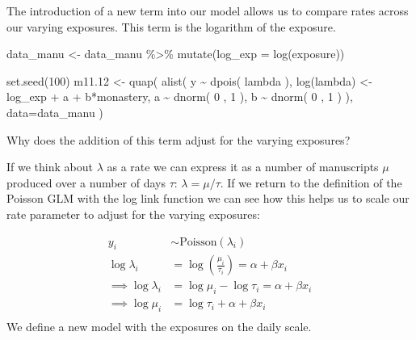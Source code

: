 \documentclass[
]{book}
\newenvironment{Shaded}{\begin{snugshade}}{\end{snugshade}}
\newcommand{\AttributeTok}[1]{\textcolor[rgb]{0.77,0.63,0.00}{#1}}
\newcommand{\DecValTok}[1]{\textcolor[rgb]{0.00,0.00,0.81}{#1}}
\newcommand{\FloatTok}[1]{\textcolor[rgb]{0.00,0.00,0.81}{#1}}
\newcommand{\FunctionTok}[1]{\textcolor[rgb]{0.00,0.00,0.00}{#1}}
\newcommand{\NormalTok}[1]{#1}
\newcommand{\OtherTok}[1]{\textcolor[rgb]{0.56,0.35,0.01}{#1}}
\newcommand{\SpecialCharTok}[1]{\textcolor[rgb]{0.00,0.00,0.00}{#1}}
\begin{document}
The introduction of a new term into our model allows us to compare rates across our varying exposures. This term is the logarithm of the exposure.

\begin{Shaded}
\begin{Highlighting}[]
\NormalTok{data\_manu }\OtherTok{\textless{}{-}}\NormalTok{ data\_manu }\SpecialCharTok{\%\textgreater{}\%} \FunctionTok{mutate}\NormalTok{(}\AttributeTok{log\_exp =} \FunctionTok{log}\NormalTok{(exposure))}

\FunctionTok{set.seed}\NormalTok{(}\DecValTok{100}\NormalTok{)}
\NormalTok{m11}\FloatTok{.12} \OtherTok{\textless{}{-}} \FunctionTok{quap}\NormalTok{( }\FunctionTok{alist}\NormalTok{( }
\NormalTok{  y }\SpecialCharTok{\textasciitilde{}} \FunctionTok{dpois}\NormalTok{( lambda ), }
  \FunctionTok{log}\NormalTok{(lambda) }\OtherTok{\textless{}{-}}\NormalTok{ log\_exp }\SpecialCharTok{+}\NormalTok{ a }\SpecialCharTok{+}\NormalTok{ b}\SpecialCharTok{*}\NormalTok{monastery, }
\NormalTok{  a }\SpecialCharTok{\textasciitilde{}} \FunctionTok{dnorm}\NormalTok{( }\DecValTok{0}\NormalTok{ , }\DecValTok{1}\NormalTok{ ), }
\NormalTok{  b }\SpecialCharTok{\textasciitilde{}} \FunctionTok{dnorm}\NormalTok{( }\DecValTok{0}\NormalTok{ , }\DecValTok{1}\NormalTok{ )}
\NormalTok{), }\AttributeTok{data=}\NormalTok{data\_manu )}
\end{Highlighting}
\end{Shaded}

Why does the addition of this term adjust for the varying exposures?

If we think about \(\lambda\) as a rate we can express it as a number of manuscripts \(\mu\) produced over a number of days \(\tau\): \(\lambda = \mu/\tau\). If we return to the definition of the Poisson GLM with the log link function we can see how this helps us to scale our rate parameter to adjust for the varying exposures:

\[
\begin{aligned}
y_i &\sim \text{Poisson}(\lambda_i) \\
\log \lambda_i &= \log \left( \frac{\mu_i}{\tau_i} \right)= \alpha + \beta x_i \\
\implies \log \lambda_i &= \log\mu_i - \log\tau_i = \alpha + \beta x_i \\
\implies \log\mu_i &= \log\tau_i + \alpha + \beta x_i \\
\end{aligned}
\]
We define a new model with the exposures on the daily scale.
\end{document}
